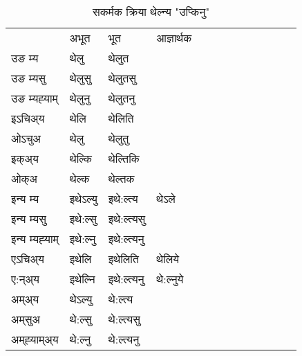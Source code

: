 \begin{table}[H]
\centering
\caption{\label{el.vt} सकर्मक क्रिया  थेल्न्य  "उप्किनु"  }
\begin{tabular}{l|l|l|l|l|l|l|l|l|l|l|l|l}  \toprule
&अभूत & भूत & आज्ञार्थक \\ 
उङ म्य &थेलु &थेलुत \\ 
उङ म्यसु &थेलुसु &थेलुतसु \\ 
उङ म्यह्‍याम् &थेलुनु &थेलुतनु \\ 
इऽचिअ्य  &थेलि &थेलिति   \\ 
ओऽचुअ &थेलु &थेलुतु   \\ 
इक्अ्य &थेल्कि &थेल्तिकि   \\ 
ओक्अ &थेल्क &थेल्तक   \\ 
इन्य म्य& इथेऽल्यु  & इथे:ल्त्य &थेऽले  \\ 
इन्य म्यसु & इथे:ल्सु  & इथे:ल्त्यसु   \\ 
इन्य म्यह्‍याम् & इथे:ल्नु  & इथे:ल्त्यनु   \\ 
एऽचिअ्य & इथेलि & इथेलिति &थेलिये    \\ 
ए:न्अ्य & इथेल्नि  & इथे:ल्त्यनु &थे:ल्नुये  \\ 
अम्अ्य & थेऽल्यु  & थे:ल्त्य  \\ 
अम्‌सुअ & थे:ल्सु & थे:ल्त्यसु  \\ 
अम्‌ह्‍याम्अ्य & थे:ल्नु  & थे:ल्त्यनु \\ 
\bottomrule
\end{tabular}
\end{table}


